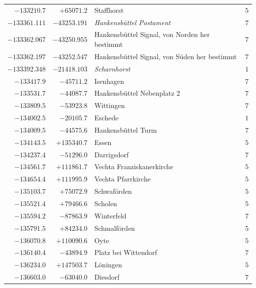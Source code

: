\begin{center}
\begin{tabular}{r|r|p{170pt}|r}
\(-133210.7\)&\(+65071.2\)&Staffhorst&\(5\)\\
\(-133361.111\)&\(-43253.191\)&\textit{Hankensbüttel Postament}&\(7\)\\
\(-133362.067\)&\(-43250.955\)&Hankensbüttel Signal, von Norden her bestimmt&\(7\)\\
\(-133362.197\)&\(-43252.547\)&Hankensbüttel Signal, von Süden her bestimmt&\(7\)\\
\(-133392.348\)&\(-21418.103\)&\textit{Scharnhorst}&\(1\)\\
\(-133417.9\)&\(-45711.2\)&Isenhagen&\(7\)\\
\(-133531.7\)&\(-44087.7\)&Hankensbüttel Nebenplatz 2&\(7\)\\
\(-133809.5\)&\(-53923.8\)&Wittingen&\(7\)\\
\(-134002.5\)&\(-20105.7\)&Eschede&\(1\)\\
\(-134009.5\)&\(-44575.6\)&Hankensbüttel Turm&\(7\)\\
\(-134143.5\)&\(+135340.7\)&Essen&\(5\)\\
\(-134237.4\)&\(-51296.0\)&Darrigsdorf&\(7\)\\
\(-134561.7\)&\(+111861.7\)&Vechta Franziskanerkirche&\(5\)\\
\(-134654.4\)&\(+111995.9\)&Vechta Pfarrkirche&\(5\)\\
\(-135103.7\)&\(+75072.9\)&Schwaförden&\(5\)\\
\(-135521.4\)&\(+79466.6\)&Scholen&\(5\)\\
\(-135594.2\)&\(-87863.9\)&Winterfeld&\(7\)\\
\(-135791.5\)&\(+84234.0\)&Schmalförden&\(5\)\\
\(-136070.8\)&\(+110090.6\)&Oyte&\(5\)\\
\(-136140.4\)&\(-43894.9\)&Platz bei Wittendorf&\(7\)\\
\(-136234.0\)&\(+147503.7\)&Löningen&\(5\)\\
\(-136603.0\)&\(-63040.0\)&Diesdorf&\(7\)\\
\hline\end{tabular}\endgroup\end{center}
\clearpage

